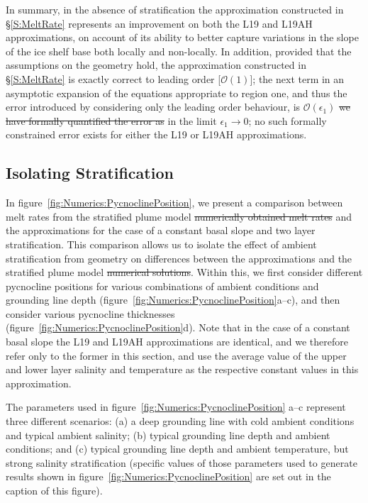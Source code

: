 \documentclass[openacc]{rsproca_new}%
\newcommand{\order}[1]{\mathcal{O}(#1)}
\newcommand{\red}[1]{{\color{red} #1}}
\newcommand{\blue}[1]{{\color{blue} #1}}
\newcommand{\rout}[1]{\red{\st{#1}}}\newcommand{\ab}[1]{\textcolor{Green}{#1}}\newcommand{\about}[1]{\textcolor{Cyan}{\sout{#1}}}
\newcommand{\epsone}{\epsilon_{1}} %
\begin{document}
In summary, in the absence of stratification the approximation constructed in \S\ref{S:MeltRate} represents an improvement on both the L19 and L19AH approximations, on account of its ability to better capture variations in the slope of the ice shelf base both locally and non-locally. In addition, provided that the assumptions on the geometry hold, \blue{the approximation constructed in \S\ref{S:MeltRate} is exactly correct to leading order [$\order{1}$]; the next term in an asymptotic expansion of the equations appropriate to region one, and thus the error introduced by considering only the leading order behaviour, is $\order{\epsone}$} \rout{we have formally quantified the error as}\blue{in the limit $\epsone \to 0$}; no such \blue{formally} constrained error exists for either the L19 or L19AH approximations. 

\subsection{Isolating Stratification}
In figure~\ref{fig:Numerics:PycnoclinePosition}, we present a comparison between \blue{melt rates from the stratified plume model}\rout{numerically obtained melt rates} and the approximations for the case of a constant basal slope and two layer stratification. This comparison allows us to isolate the effect of ambient stratification from geometry on differences between the approximations and \blue{the stratified plume model}\rout{numerical solutions}. \blue{Within this, we first consider different pycnocline positions for various combinations of ambient conditions and grounding line depth (figure~\ref{fig:Numerics:PycnoclinePosition}a--c), and then consider various pycnocline thicknesses (figure~\ref{fig:Numerics:PycnoclinePosition}d).}  Note that in the case of a constant basal slope the L19 and L19AH approximations are identical, and we therefore refer only to the former in this section, and use the average value of the upper and lower layer salinity and temperature as the respective constant values in this approximation.

The parameters used in figure~\ref{fig:Numerics:PycnoclinePosition}\blue{a--c} represent three different scenarios: (a) a deep grounding line with cold ambient conditions and typical ambient salinity; (b) typical grounding line depth and ambient conditions; and (c) typical grounding line depth and ambient temperature, but strong salinity stratification \blue{(specific values of those parameters used to generate results shown in figure~\ref{fig:Numerics:PycnoclinePosition} are set out in the caption of this figure)}.
\end{document}
